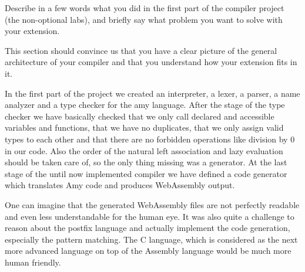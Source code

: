 Describe in a few words what you did in the first part of the compiler project
(the non-optional labs), and briefly say what problem you want to solve with
your extension.

This section should convince us that you have a clear picture of the general
architecture of your compiler and that you understand how your extension fits
in it.

In the first part of the project we created an interpreter, a lexer, a parser, a name analyzer and a type checker for the amy language.
After the stage of the type checker we have basically checked that we only call declared and accessible variables and functions, that we have no duplicates, that we only assign valid types to each other and that there are no forbidden operations like division by 0 in our code. Also the order of the natural left association and lazy evaluation should be taken care of, so the only thing missing was a generator.
At the last stage of the until now implemented compiler we have defined a code generator which translates Amy code and produces WebAssembly output.

One can imagine that the generated WebAssembly files are not perfectly readable and even less understandable for the human eye. It was also quite a challenge to reason about the postfix language and actually implement the code generation, especially the pattern matching.
The C language, which is considered as the next more advanced language on top of the Assembly language would be much more human friendly.
